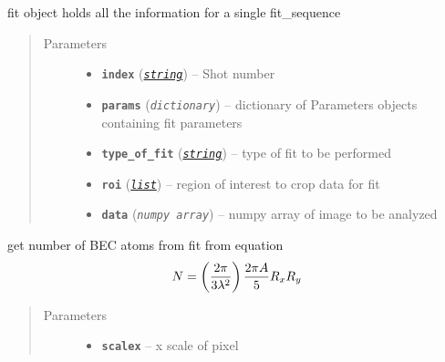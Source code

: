 \documentclass[letterpaper,10pt,english]{sphinxmanual}
\begin{document}
\begin{fulllineitems}
\label{fit_object:Fitobject.fit_object}
fit object holds all the information for a single fit\_sequence
\begin{quote}\begin{description}
\item[{Parameters}] \leavevmode\begin{itemize}
\item {} 
\textbf{\texttt{index}} (\href{https://docs.python.org/library/string.html\#module-string}{\emph{\texttt{string}}}) -- Shot number

\item {} 
\textbf{\texttt{params}} (\emph{\texttt{dictionary}}) -- dictionary of Parameters objects containing fit parameters

\item {} 
\textbf{\texttt{type\_of\_fit}} (\href{https://docs.python.org/library/string.html\#module-string}{\emph{\texttt{string}}}) -- type of fit to be performed

\item {} 
\textbf{\texttt{roi}} (\href{https://docs.python.org/library/functions.html\#list}{\emph{\texttt{list}}}) -- region of interest to crop data for fit

\item {} 
\textbf{\texttt{data}} (\emph{\texttt{numpy array}}) -- numpy array of image to be analyzed

\end{itemize}

\end{description}\end{quote}

\begin{fulllineitems}
\label{fit_object:Fitobject.fit_object.BEC_num}
get number of BEC atoms from fit from equation
\begin{gather}
\begin{split}N = \left(\frac{2 \pi}{3\lambda^2}\right)\frac{2\pi A}{5}R_x R_y\end{split}\notag
\end{gather}\begin{quote}\begin{description}
\item[{Parameters}] \leavevmode\begin{itemize}
\item {} 
\textbf{\texttt{scalex}} -- x scale of pixel


\end{itemize}
\end{description}
\end{quote}
\end{fulllineitems}
\end{fulllineitems}
\end{document}
